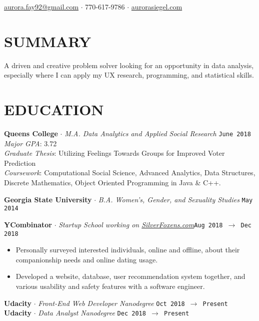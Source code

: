 \documentclass[margin, line, 11pt]{res}
\begin{document}
\noindent\hspace{-1.0in}{\LARGE\bf Aurora Siegel}
\hfill \href{mailto:aurora.fay92@gmail.com}{aurora.fay92@gmail.com}
$\cdot$ 770-617-9786
$\cdot$ \href{http://aurorasiegel.com}{aurorasiegel.com}

\begin{resume}

\section{SUMMARY}

A driven and creative problem solver looking for an opportunity in data analysis, especially where I can apply my UX research, programming, and statistical skills. 

\section{EDUCATION}

{\bf Queens College} $\cdot$ {\it M.A. Data Analytics and Applied Social Research} \hfill \texttt{June 2018}
\\{\it  Major GPA}: 3.72
\\{\it Graduate Thesis}: Utilizing Feelings Towards Groups for Improved Voter Prediction
\\{\it Coursework}: Computational Social Science, Advanced Analytics, Data Structures, Discrete 
Mathematics, Object Oriented Programming in Java \& C++.

{\bf Georgia State University} $\cdot$ {\it B.A. Women's, Gender, and Sexuality Studies} \hfill \texttt{May 2014}

{\bf YCombinator} $\cdot$ {\it Startup School working on \href{http://silverfoxens.com}{SilverFoxens.com}}\hfill \texttt{Aug 2018 $\rightarrow$ Dec 2018}
\begin{itemize}
  \item Personally surveyed interested individuals, online and offline, about their companionship needs and online dating usage.
  \item Developed a website, database, user recommendation system together, and various usability and safety features with a software engineer.
\end{itemize}
{\bf Udacity} $\cdot$ {\it Front-End Web Developer Nanodegree} \hfill \texttt{Oct 2018 $\rightarrow$  Present}
\\ {\bf Udacity} $\cdot$ {\it Data Analyst Nanodegree} \hfill \texttt{Dec 2018 $\rightarrow$  Present}


\end{resume}
\end{document}
